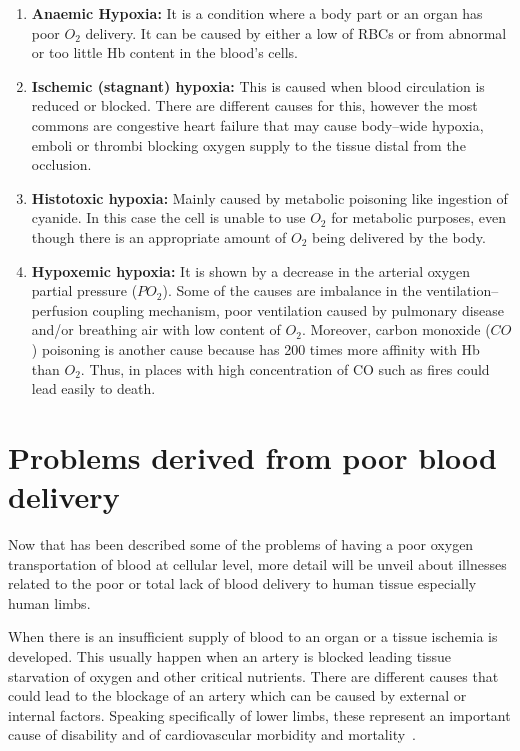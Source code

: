 \begin{enumerate}
	\item \textbf{Anaemic Hypoxia:} It is a condition where a body part or an organ has poor $O_2$ delivery. It can be caused by either a low of RBCs or from abnormal or too little Hb content in the blood's cells.
	\item \textbf{Ischemic (stagnant) hypoxia: }This is caused when blood circulation is reduced or blocked. There are different causes for this, however the most commons are congestive heart failure that may cause body–wide hypoxia, emboli or thrombi blocking oxygen supply to the tissue distal from the occlusion. 
	\item \textbf{Histotoxic hypoxia: }Mainly caused by metabolic poisoning like ingestion of cyanide. In this case the cell is unable to use $O_2$ for metabolic purposes, even though there is an appropriate amount of $O_2$ being delivered by the body.
	\item \textbf{Hypoxemic hypoxia:} It is shown by a decrease in the arterial oxygen partial pressure ($PO_2$). Some of the causes are imbalance in the ventilation–perfusion coupling mechanism, poor ventilation caused by pulmonary disease and/or breathing air with low content of $O_2$. Moreover, carbon monoxide ($CO$) poisoning is another cause because has \num{200} times more affinity with Hb than $O_2$. Thus, in places with high concentration of CO such as fires could lead easily to death.
\end{enumerate}

\section{Problems derived from poor blood delivery} %
Now that has been described some of the problems of having a poor oxygen transportation of blood at cellular level, more detail will be unveil about illnesses related to the poor or total lack of blood delivery to human tissue especially human limbs. 

When there is an insufficient supply of blood to an organ or a tissue ischemia is developed. This usually happen when an artery is blocked leading tissue starvation of oxygen and other critical nutrients. There are different causes that could lead to the blockage of an artery which can be caused by external or internal factors. Speaking specifically of lower limbs, these represent an important cause of disability and of cardiovascular morbidity and mortality~\cite{novo1995patients}. 

